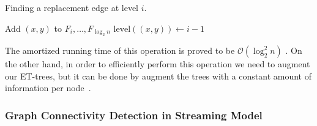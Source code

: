 \documentclass[12pt,a4paper]{article}
\begin{document}
\begin{itemize}
\begin{enumerate}
\begin{algorithm}[H]
\caption{Finding a replacement edge at level $i$.}\label{algo:replace}
\begin{algorithmic}[1]
    	\State Add $(x, y)$ to $F_i, \dots, F_{\log_2 n}$
        \State \Return
    \Else
    	\State $\text{level}((x, y)) \leftarrow i - 1$
    \EndIf
\EndFor
\end{algorithmic}
\end{algorithm}

The amortized running time of this operation is proved to be $\mathcal{O}(\log_2^2 n)$ \cite{holm2001poly, mit, tor, stanford}. On the other hand, in order to efficiently perform this operation we need to augment our ET-trees, but it can be done by augment the trees with a constant amount of information per node~\cite{holm2001poly, mit, tor, stanford}.
\end{enumerate}

\end{itemize}


\subsubsection*{Graph Connectivity Detection in Streaming Model}
\end{document}
